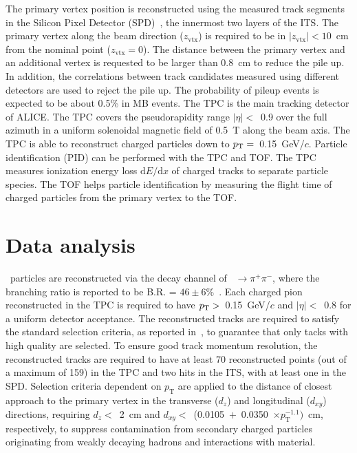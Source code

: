 The primary vertex position is reconstructed using the measured track segments in the Silicon Pixel Detector (SPD)~\cite{Santoro2009:ALICESPD}, the innermost two layers of the ITS. The primary vertex along the beam direction ($z_\mathrm{vtx}$) is required to be in $|z_\mathrm{vtx}|<10$~cm from the nominal point ($z_\mathrm{vtx}=0$). The distance between the primary vertex and an additional vertex is requested to be larger than 0.8~cm to reduce the pile up. In addition, the correlations between track candidates measured
using different detectors are used to reject the pile up. The probability of pileup events is expected to be about 0.5\% in MB events. The TPC is the main tracking detector of ALICE. The TPC covers the pseudorapidity range $|\eta|<$~0.9 over the full azimuth in a uniform solenoidal magnetic field of 0.5~T along the beam axis. The TPC is able to reconstruct charged particles down to $p_{\rm{T}}=$~0.15~GeV/$c$. Particle identification (PID) can be performed with the TPC and TOF. The TPC measures ionization energy loss $\mathrm{d}E/\mathrm{d}x$ of charged tracks to separate particle species. The TOF helps particle identification by measuring the flight time of charged particles from the primary vertex to the TOF.

\section{Data analysis}

\fzero~particles are reconstructed via the decay channel of \fzero~$\rightarrow \pi^{+}\pi^{-}$, where the branching ratio is reported to be B.R. = $46\pm6$\%~\cite{Stone:2013eaa}. Each charged pion reconstructed in the TPC is required to have $p_{\rm{T}}>$~0.15~GeV/$c$ and $|\eta|<$~0.8 for a uniform detector acceptance. The reconstructed tracks are required to satisfy the standard selection criteria, as reported in~\cite{ALICE:2022qnb}, to guarantee that only tacks with high quality are selected. To ensure good track momentum resolution, the reconstructed tracks are required to have at least 70 reconstructed points (out of a maximum of 159) in the TPC and two hits in the ITS, with at least one in the SPD. Selection criteria dependent on $p_{\mathrm{T}}$ are applied to the distance of closest approach to the primary vertex in the transverse ($d_{z}$) and longitudinal ($d_{xy}$) directions, requiring $d_{z}<$~2~cm and $d_{xy}<$~(0.0105~$+$~0.0350~$\times p_{\mathrm{T}}^{-1.1})$~cm, respectively, to suppress contamination from secondary charged particles originating from weakly decaying hadrons and interactions with material.

